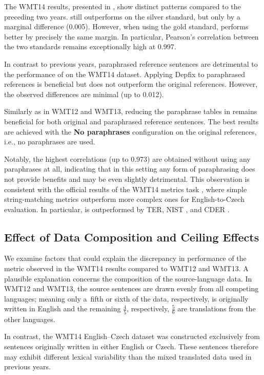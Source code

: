 The WMT14 results, presented in , show distinct patterns compared to the preceding two years. \parmesan still outperforms \mn on the silver standard, but only by a marginal difference (0.005). However, when using the gold standard, \mn performs better by precisely the same margin. In particular, Pearson's correlation between the two standards remains exceptionally high at 0.997.

In contrast to previous years, paraphrased reference sentences are detrimental to the performance of \mn on the WMT14 dataset. Applying Depfix to paraphrased references is beneficial but does not outperform the original references. However, the observed differences are minimal (up to 0.012).

Similarly as in WMT12 and WMT13, reducing the paraphrase tables in \mn remains beneficial for both original and paraphrased reference sentences. The best results are achieved with the \textbf{No paraphrases} configuration on the original references, i.e., no paraphrases are used. 

Notably, the highest correlations (up to 0.973) are obtained without using any paraphrases at all, indicating that in this setting any form of paraphrasing does not provide benefits and may be even slightly detrimental. This observation is consistent with the official results of the WMT14 metrics task \citep{machacek-bojar-2014-results}, where simple string-matching metrics outperform more complex ones for English-to-Czech evaluation. In particular, \mn is outperformed by TER, NIST \citep{nist}, and CDER \citep{leusch-etal-2006-cder}.

\subsection{Effect of Data Composition and Ceiling Effects}
We examine factors that could explain the discrepancy in performance of the \parmesan metric observed in the WMT14 results compared to WMT12 and WMT13. A plausible explanation concerns the composition of the source-language data. In WMT12 and WMT13, the source sentences are drawn evenly from all competing languages;
meaning only a~fifth or sixth of the data, respectively, is originally written in English and the remaining $ \frac{4}{5} $, respectively, $\frac{5}{6} $ are translations from the other languages. 

In contrast, the WMT14 English–Czech dataset was constructed exclusively from sentences originally written in either English or Czech. These sentences therefore may exhibit different lexical variability than the mixed translated data used in previous years.

